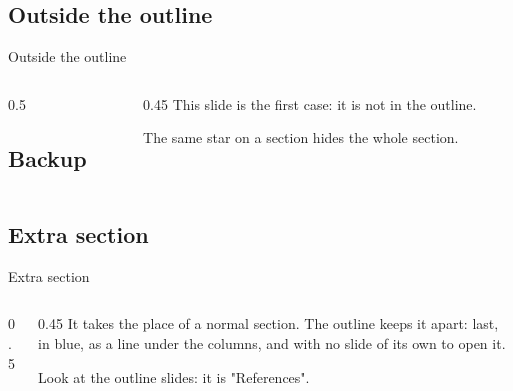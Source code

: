 \subsection*{Outside the outline}
\begin{frame}{Outside the outline}
\begin{columns}[T,onlytextwidth]
\begin{column}{0.5\textwidth}
\begin{codeonly}
\subsection*{Backup}
\end{codeonly}
\smallskip
{}
\begin{codeonly}
\end{codeonly}
\end{column}
\begin{column}{0.45\textwidth}
\stepoffset
This slide is the first case: it is not in the outline.

\medskip
The same star on a section hides the whole section.
\end{column}
\end{columns}
\end{frame}

\subsection{Extra section}
\begin{frame}{Extra section}
\begin{columns}[T,onlytextwidth]
\begin{column}{0.5\textwidth}
\begin{codeonly}
\end{codeonly}
\end{column}
\begin{column}{0.45\textwidth}
\stepoffset
It takes the place of a normal section. The outline keeps it apart: last, in blue, as a line under the columns, and with no slide of its own to open it.

\medskip
Look at the outline slides: it is "References".
\end{column}
\end{columns}
\end{frame}

